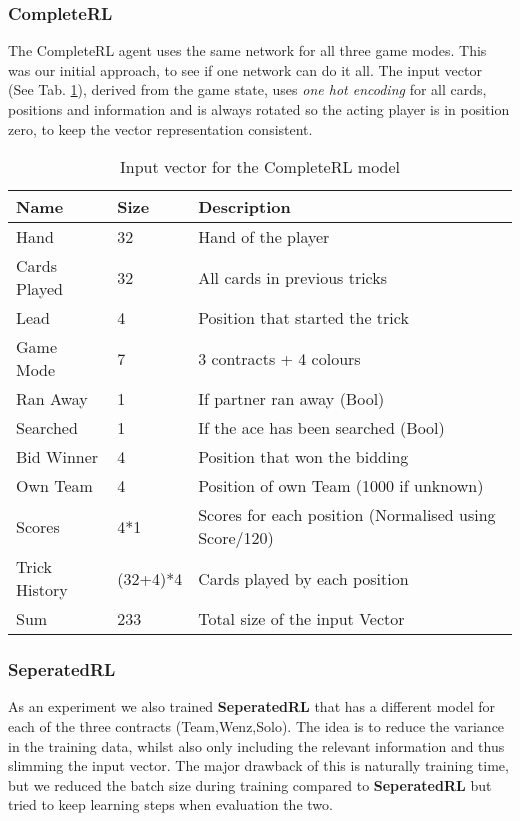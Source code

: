 {\subsubsection{CompleteRL}
The CompleteRL agent uses the same network for all three game modes.
This was our initial approach, to see if one network can do it all.
The input vector (See Tab. \ref{tab:CompleteRLinput}), derived from the game state, uses \textit{one hot encoding}
for all cards, positions and information and is always rotated so the acting player is in position zero, to keep the
vector representation
consistent.\\
\begin{table}[!h]
\centering
\begin{tabular}{lll}
\toprule
Name          & Size     & Description                                           \\
\midrule
Hand          & 32       & Hand of the player                                    \\
Cards Played  & 32       & All cards in previous tricks                          \\
Lead          & 4        & Position that started the trick                       \\
Game Mode     & 7        & 3 contracts + 4 colours                               \\
Ran Away      & 1        & If partner ran away (Bool)                            \\
Searched      & 1        & If the ace has been searched (Bool)                   \\
Bid Winner    & 4        & Position that won the bidding                         \\
Own Team      & 4        & Position of own Team (1000 if unknown)                \\
Scores        & 4*1      & Scores for each position (Normalised using Score/120) \\
Trick History & (32+4)*4 & Cards played by each position                        \\
\midrule
Sum & 233 & Total size of the input Vector\\
\bottomrule
\end{tabular}
\caption{Input vector for the CompleteRL model}
\label{tab:CompleteRLinput}
\end{table}

\subsubsection{SeperatedRL}
As an experiment we also trained \textbf{SeperatedRL} that has a different model for each of the three contracts
(Team,Wenz,Solo).
The idea is to reduce the variance in the training data, whilst also only including the relevant information and thus
slimming the input vector.
The major drawback of this is naturally training time, but we reduced the batch size during training compared to
\textbf{SeperatedRL} but tried to keep learning steps when evaluation the two.

}
